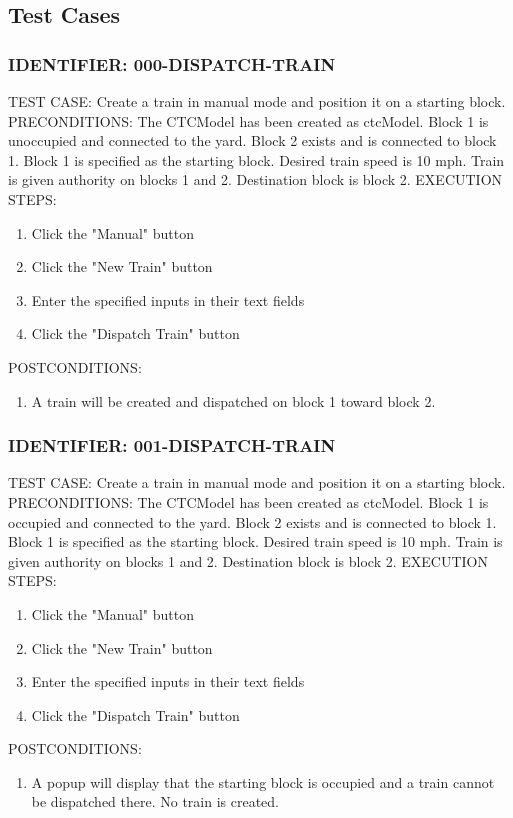 \documentclass{scrreprt}
\begin{document}
\subsection{Test Cases}

\subsubsection{IDENTIFIER: 000-DISPATCH-TRAIN}
TEST CASE: Create a train in manual mode and position it on a starting block.
PRECONDITIONS: The CTCModel has been created as ctcModel. Block 1 is unoccupied and connected to the yard. Block 2 exists and is connected to block 1. Block 1 is specified as the starting block. Desired train speed is 10 mph. Train is given authority on blocks 1 and 2. Destination block is block 2.
EXECUTION STEPS:
\begin{enumerate}
	\item Click the "Manual" button
	\item Click the "New Train" button
	\item Enter the specified inputs in their text fields
	\item Click the "Dispatch Train" button
\end{enumerate}
POSTCONDITIONS:
\begin{enumerate}
	\item A train will be created and dispatched on block 1 toward block 2.
\end{enumerate}

\subsubsection{IDENTIFIER: 001-DISPATCH-TRAIN}
TEST CASE: Create a train in manual mode and position it on a starting block.
PRECONDITIONS: The CTCModel has been created as ctcModel. Block 1 is occupied and connected to the yard. Block 2 exists and is connected to block 1. Block 1 is specified as the starting block. Desired train speed is 10 mph. Train is given authority on blocks 1 and 2. Destination block is block 2.
EXECUTION STEPS:
\begin{enumerate}
	\item Click the "Manual" button
	\item Click the "New Train" button
	\item Enter the specified inputs in their text fields
	\item Click the "Dispatch Train" button
\end{enumerate}
POSTCONDITIONS:
\begin{enumerate}
	\item A popup will display that the starting block is occupied and a train cannot be dispatched there. No train is created.
\end{enumerate}
\end{document}
